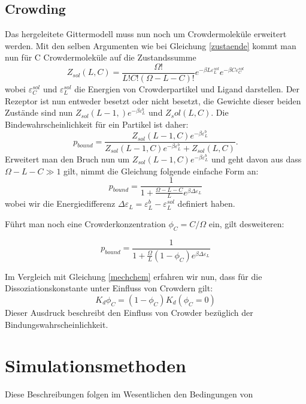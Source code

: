 \documentclass[bachelor,       %
               twoside,        %
               BCOR10mm,       %
               english,ngerman, %
               ]{GAUBM}
\begin{document}
\subsection{Crowding}
Das hergeleitete Gittermodell muss nun noch um Crowdermoleküle erweitert werden.
Mit den selben Argumenten wie bei Gleichung \ref{zustaende} kommt man nun für C Crowdermoleküle auf die Zustandssumme
\begin{equation}
Z_{sol}(L,C) = \frac{\Omega!}{L!C!(\Omega-L-C)!}e^{-\beta L\varepsilon_L^{sol}}e^{-\beta C\varepsilon_C^{sol}}
\end{equation}
wobei $\varepsilon_C^{sol}$ und $\varepsilon_L^{sol}$ die Energien von Crowderpartikel und Ligand darstellen.
Der Rezeptor ist nun entweder besetzt oder nicht besetzt, die Gewichte dieser beiden Zustände sind nun
$Z_{sol}(L-1,)e^{-\beta\varepsilon_L^b}$ und $Z_sol(L,C)$. Die Bindewahrscheinlichkeit für ein Partikel ist daher:
\begin{equation}
p_{bound} = \frac{Z_{sol}(L-1,C)e^{-\beta\varepsilon_L^b}}{Z_{sol}(L-1,C)e^{-\beta\varepsilon_L^b}+Z_{sol}(L,C)}.
\end{equation}
Erweitert man den Bruch nun um $Z_{sol}(L-1,C)e^{-\beta\varepsilon_L^b}$ und geht davon aus dass
$\Omega-L-C \gg 1$ gilt, nimmt die Gleichung folgende einfache Form an:
\begin{equation}
p_{bound} = \frac{1}{1+\frac{\Omega-L-C}{L}e^{\beta\Delta\varepsilon_L}}
\end{equation}
wobei wir die Energiedifferenz $\Delta\varepsilon_L = \varepsilon_L^b - \varepsilon_L^{sol}$ definiert haben.

Führt man noch eine Crowderkonzentration $\phi_C = C/\Omega$ ein, gilt desweiteren:

\begin{equation}
p_{bound} = \frac{1}{1+\frac{\Omega}{L}(1-\phi_C)e^{\beta\Delta\varepsilon_L}}
\end{equation}

Im Vergleich mit Gleichung \ref{mechchem} erfahren wir nun, dass für die Dissoziationskonstante unter
Einfluss von Crowdern gilt:
\begin{equation}
K_d{\phi_C} = (1-\phi_C) K_d(\phi_C = 0)
\end{equation}
Dieser Ausdruck beschreibt den Einfluss von Crowder bezüglich der Bindungswahrscheinlichkeit.



\section{Simulationsmethoden}
Diese Beschreibungen folgen im Wesentlichen den Bedingungen von \cite{frontphy}
\end{document}
